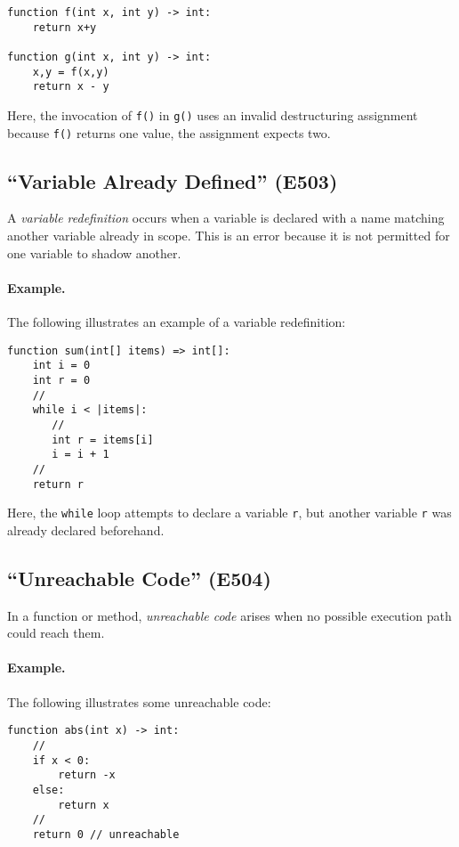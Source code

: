 \begin{lstlisting}
function f(int x, int y) -> int:
    return x+y

function g(int x, int y) -> int:
    x,y = f(x,y)
    return x - y
\end{lstlisting}

Here, the invocation of \lstinline{f()} in \lstinline{g()} uses an invalid destructuring assignment because \lstinline{f()} returns one value, the assignment expects two.

\subsection{``Variable Already Defined'' (E503)}

A {\em variable redefinition} occurs when a variable is declared with a name matching another variable already in scope.  This is an error because it is not permitted for one variable to shadow another.

\paragraph{Example.}  The following illustrates an example of a variable redefinition:

\begin{lstlisting}
function sum(int[] items) => int[]:
    int i = 0
    int r = 0
    //
    while i < |items|:
       //
       int r = items[i]
       i = i + 1
    //
    return r
\end{lstlisting}

Here, the \lstinline{while} loop attempts to declare a variable \lstinline{r}, but another variable \lstinline{r} was already declared beforehand.

\subsection{``Unreachable Code'' (E504)}

In a function or method, {\em unreachable code} arises when no possible execution path could reach them.  

\paragraph{Example.} The following illustrates some unreachable code:

\begin{lstlisting}
function abs(int x) -> int:
    //
    if x < 0:
        return -x
    else:
        return x
    //
    return 0 // unreachable
\end{lstlisting}

